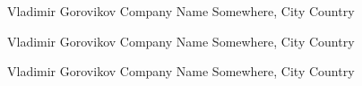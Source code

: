 \documentclass{article}%
\begin{document}
\begin{minipage}{0.5\textwidth}%
Vladimir Gorovikov%
\newline%
%
Company Name%
\newline%
%
Somewhere, City%
\newline%
%
Country%
\end{minipage}%
\vspace*{20pt}%
\linebreak%
\begin{minipage}{0.5\textwidth}%
Vladimir Gorovikov%
\newline%
%
Company Name%
\newline%
%
Somewhere, City%
\newline%
%
Country%
\end{minipage}%
\begin{minipage}{0.5\textwidth}%
Vladimir Gorovikov%
\newline%
%
Company Name%
\newline%
%
Somewhere, City%
\newline%
%
Country%
\end{minipage}%
\vspace*{20pt}%
\linebreak%
\end{document}
